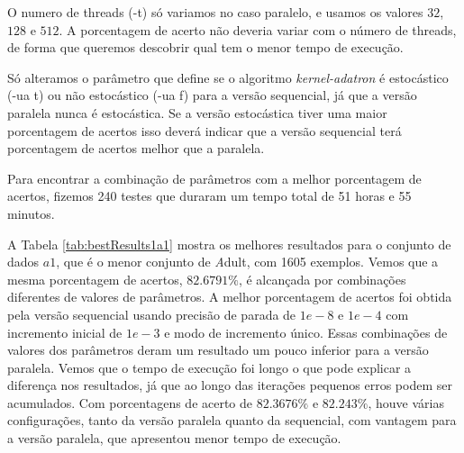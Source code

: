 O numero de threads (-t) só variamos no caso paralelo, e usamos os valores $32$, $128$ e $512$. A porcentagem de acerto não deveria variar com o número de threads, de forma que queremos descobrir qual tem o menor tempo de execução.

Só alteramos o parâmetro que define se o algoritmo {\em kernel-adatron}  é estocástico (-ua t) ou não estocástico (-ua f) para a versão sequencial, já que a versão paralela nunca é estocástica. Se a versão estocástica tiver uma maior porcentagem de acertos isso deverá indicar que a versão sequencial terá porcentagem de acertos melhor que a paralela.


Para encontrar a combinação de parâmetros com a melhor porcentagem de acertos, fizemos 240 testes que duraram um tempo total de 51 horas e 55 minutos.

A Tabela \ref{tab:bestResults1a1} mostra os melhores resultados para o conjunto de dados $a1$, que é o menor conjunto de {\emph Adult}, com 1605 exemplos. Vemos que a mesma porcentagem de acertos, $82.6791\%$, é alcançada por combinações diferentes de valores de parâmetros. A melhor porcentagem de acertos foi obtida pela versão sequencial usando precisão de parada de $1e-8$ e $1e-4$ com incremento inicial de $1e-3$ e modo de incremento único. Essas combinações de valores dos parâmetros deram um resultado um pouco inferior para a versão paralela. Vemos que o tempo de execução foi longo o que pode explicar a diferença nos resultados, já que ao longo das iterações pequenos erros podem ser acumulados. Com porcentagens de acerto de $82.3676\%$ e $82.243\%$, houve várias configurações, tanto da versão paralela quanto da sequencial, com vantagem para a versão paralela, que apresentou menor tempo de execução.

